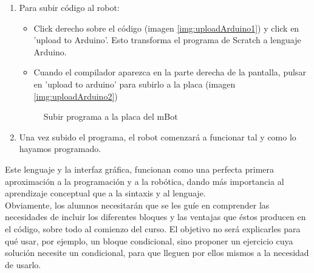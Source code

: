 \begin{enumerate}
	\item Para subir código al robot:
		\begin{itemize}
			\item Click derecho sobre el código (imagen \ref{img:uploadArduino1}) y click en 'upload to Arduino'. Esto transforma el programa de Scratch a lenguaje Arduino.
			\item Cuando el compilador aparezca en la parte derecha de la pantalla, pulsar en 'upload to arduino' para subirlo a la placa (imagen \ref{img:uploadArduino2})
		\end{itemize}
	\begin{figure}[H]
		\centering
		\begin{subfigure}
			[Compilar programa]{
				\texttt{[image: mblock4.png]}
				\label{img:uploadArduino1}}
		\end{subfigure}
		\begin{subfigure}
			[Subir programa a la placa]{
				\texttt{[image: mblock5.png]}
				\label{img:uploadArduino2}}
		\end{subfigure}
	\caption{Subir programa a la placa del mBot}
	\label{img:uploadArduino}
	\end{figure}

	\item Una vez subido el programa, el robot comenzará a funcionar tal y como lo hayamos programado.
\end{enumerate}
 

\par Este lenguaje y la interfaz gráfica, funcionan como una perfecta primera aproximación a la programación y a la robótica, dando más importancia al aprendizaje conceptual que a la sintaxis y al lenguaje. \\
Obviamente, los alumnos necesitarán que se les guíe en comprender las necesidades de incluir los diferentes bloques y las ventajas que éstos producen en el código, sobre todo al comienzo del curso. El objetivo no será explicarles para qué usar, por ejemplo, un bloque condicional, sino proponer un ejercicio cuya solución necesite un condicional, para que lleguen por ellos mismos a la necesidad de usarlo.
